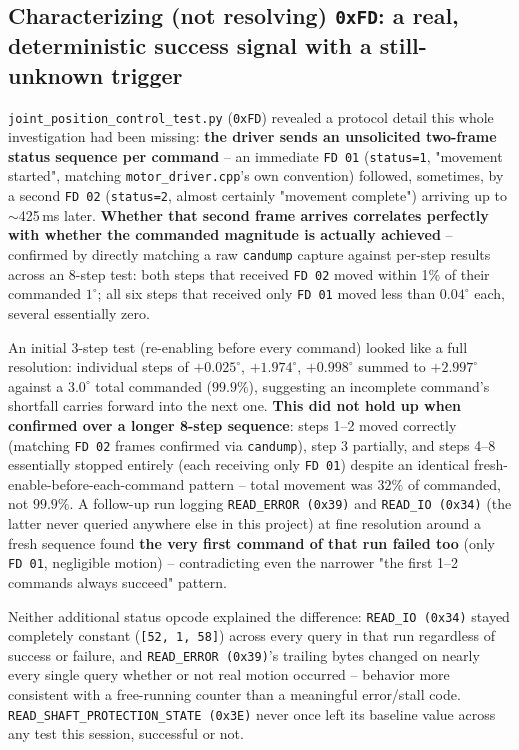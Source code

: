 \documentclass[11pt,letterpaper]{article}
\begin{document}
\subsection{Characterizing (not resolving) \texttt{0xFD}: a real, deterministic success signal with a still-unknown trigger}
\texttt{joint\_position\_control\_test.py} (\texttt{0xFD}) revealed a protocol detail this whole investigation had been missing: \textbf{the driver sends an unsolicited two-frame status sequence per command} -- an immediate \texttt{FD 01} (\texttt{status=1}, "movement started", matching \texttt{motor\_driver.cpp}'s own convention) followed, sometimes, by a second \texttt{FD 02} (\texttt{status=2}, almost certainly "movement complete") arriving up to $\sim$425\,ms later. \textbf{Whether that second frame arrives correlates perfectly with whether the commanded magnitude is actually achieved} -- confirmed by directly matching a raw \texttt{candump} capture against per-step results across an 8-step test: both steps that received \texttt{FD 02} moved within 1\% of their commanded $1^\circ$; all six steps that received only \texttt{FD 01} moved less than $0.04^\circ$ each, several essentially zero.

An initial 3-step test (re-enabling before every command) looked like a full resolution: individual steps of $+0.025^\circ$, $+1.974^\circ$, $+0.998^\circ$ summed to $+2.997^\circ$ against a $3.0^\circ$ total commanded ($99.9\%$), suggesting an incomplete command's shortfall carries forward into the next one. \textbf{This did not hold up when confirmed over a longer 8-step sequence}: steps 1--2 moved correctly (matching \texttt{FD 02} frames confirmed via \texttt{candump}), step 3 partially, and steps 4--8 essentially stopped entirely (each receiving only \texttt{FD 01}) despite an identical fresh-enable-before-each-command pattern -- total movement was $32\%$ of commanded, not $99.9\%$. A follow-up run logging \texttt{READ\_ERROR (0x39)} and \texttt{READ\_IO (0x34)} (the latter never queried anywhere else in this project) at fine resolution around a fresh sequence found \textbf{the very first command of that run failed too} (only \texttt{FD 01}, negligible motion) -- contradicting even the narrower "the first 1--2 commands always succeed" pattern.

Neither additional status opcode explained the difference: \texttt{READ\_IO (0x34)} stayed completely constant (\texttt{[52, 1, 58]}) across every query in that run regardless of success or failure, and \texttt{READ\_ERROR (0x39)}'s trailing bytes changed on nearly every single query whether or not real motion occurred -- behavior more consistent with a free-running counter than a meaningful error/stall code. \texttt{READ\_SHAFT\_PROTECTION\_STATE (0x3E)} never once left its baseline value across any test this session, successful or not.
\end{document}
